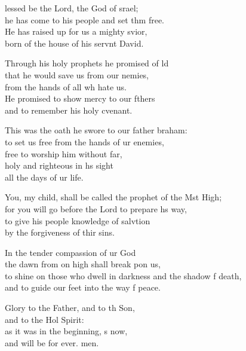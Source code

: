 \begin{psalmverse}
  \begin{patverse}
lessed be the Lord, the God of srael;\Med\\
he has come to his people and set thm free.\\
He has raised up for us a mighty svior,\Med\\
born of the house of his servnt David.

Through his holy prophets he promised of ld\Flex\\
that he would save us from our nemies,\Med\\
from the hands of all wh hate us.\\
He promised to show mercy to our fthers\Med\\
and to remember his holy cvenant.

This was the oath he swore to our father braham:\Med\\
to set us free from the hands of ur enemies,\\
free to worship him without far,\Flex\\
holy and righteous in h\pointup{\i}s sight\Med\\
all the days of ur life.

You, my child, shall be called the prophet of the Mst High;\Med\\
for you will go before the Lord to prepare h\pointup{\i}s way,\\
to give his people knowledge of salvtion\Med\\
by the forgiveness of thir sins.

In the tender compassion of ur God\Med\\
the dawn from on high shall break pon us,\\
to shine on those who dwell in darkness and the shadow f death,\Med\\
and to guide our feet into the way f peace.

Glory to the Father, and to th Son,\Med\\
and to the Hol Spirit:\\
as it was in the beginning, \pointup{\i}s now,\Med\\
and will be for ever. men.
  \end{patverse}
  \end{psalmverse}
